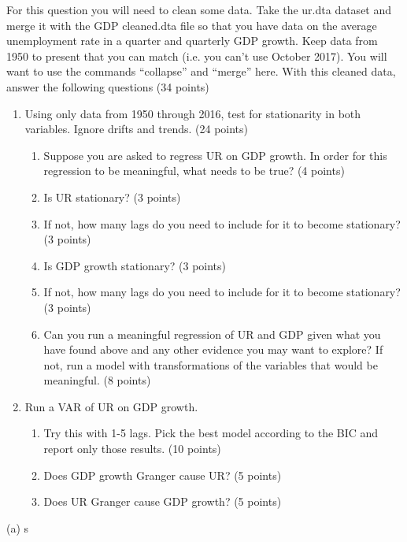 \documentclass{article}
\begin{document}
For this question you will need to clean some data. Take the
ur.dta dataset and merge it with the GDP cleaned.dta file so that you have
data on the average unemployment rate in a quarter and quarterly GDP
growth. Keep data from 1950 to present that you can match (i.e. you can’t
use October 2017). You will want to use the commands “collapse” and
“merge” here. With this cleaned data, answer the following questions (34
points)
\begin{enumerate}
\item Using only data from 1950 through 2016, test for stationarity in both variables. Ignore drifts and trends. (24 points)
\begin{enumerate}
\item Suppose you are asked to regress UR on GDP growth. In order for this regression to be meaningful, what needs to be true? (4 points)
\item Is UR stationary? (3 points)
\item If not, how many lags do you need to include for it to become stationary? (3 points)
\item Is GDP growth stationary? (3 points)
\item If not, how many lags do you need to include for it to become stationary? (3 points)
\item Can you run a meaningful regression of UR and GDP given what you have found above and any other evidence you may want to explore? If not, run a model with transformations of the variables that would be meaningful. (8 points)
\end{enumerate}
\item Run a VAR of UR on GDP growth.
\begin{enumerate}
\item Try this with 1-5 lags. Pick the best model according to the BIC and report only those results. (10 points)
\item Does GDP growth Granger cause UR? (5 points)
\item Does UR Granger cause GDP growth? (5 points)
\end{enumerate}
\end{enumerate}
(a) 
s
\end{document}
